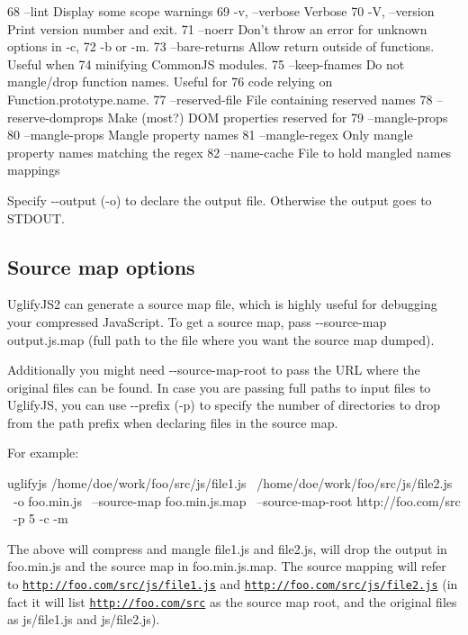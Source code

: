 \begin{DoxyCode}
68 --lint                        Display some scope warnings
69 -v, --verbose                 Verbose
70 -V, --version                 Print version number and exit.
71 --noerr                       Don't throw an error for unknown options in -c,
72                               -b or -m.
73 --bare-returns                Allow return outside of functions.  Useful when
74                               minifying CommonJS modules.
75 --keep-fnames                 Do not mangle/drop function names.  Useful for
76                               code relying on Function.prototype.name.
77 --reserved-file               File containing reserved names
78 --reserve-domprops            Make (most?) DOM properties reserved for
79                               --mangle-props
80 --mangle-props                Mangle property names
81 --mangle-regex                Only mangle property names matching the regex
82 --name-cache                  File to hold mangled names mappings
\end{DoxyCode}


Specify {\ttfamily -\/-\/output} ({\ttfamily -\/o}) to declare the output file. Otherwise the output goes to S\+T\+D\+O\+U\+T.

\subsection*{Source map options}

Uglify\+J\+S2 can generate a source map file, which is highly useful for debugging your compressed Java\+Script. To get a source map, pass {\ttfamily -\/-\/source-\/map output.\+js.\+map} (full path to the file where you want the source map dumped).

Additionally you might need {\ttfamily -\/-\/source-\/map-\/root} to pass the U\+R\+L where the original files can be found. In case you are passing full paths to input files to Uglify\+J\+S, you can use {\ttfamily -\/-\/prefix} ({\ttfamily -\/p}) to specify the number of directories to drop from the path prefix when declaring files in the source map.

For example\+: \begin{DoxyVerb}uglifyjs /home/doe/work/foo/src/js/file1.js \
         /home/doe/work/foo/src/js/file2.js \
         -o foo.min.js \
         --source-map foo.min.js.map \
         --source-map-root http://foo.com/src \
         -p 5 -c -m
\end{DoxyVerb}


The above will compress and mangle {\ttfamily file1.\+js} and {\ttfamily file2.\+js}, will drop the output in {\ttfamily foo.\+min.\+js} and the source map in {\ttfamily foo.\+min.\+js.\+map}. The source mapping will refer to {\ttfamily \href{http://foo.com/src/js/file1.js}{\tt http\+://foo.\+com/src/js/file1.\+js}} and {\ttfamily \href{http://foo.com/src/js/file2.js}{\tt http\+://foo.\+com/src/js/file2.\+js}} (in fact it will list {\ttfamily \href{http://foo.com/src}{\tt http\+://foo.\+com/src}} as the source map root, and the original files as {\ttfamily js/file1.\+js} and {\ttfamily js/file2.\+js}).

